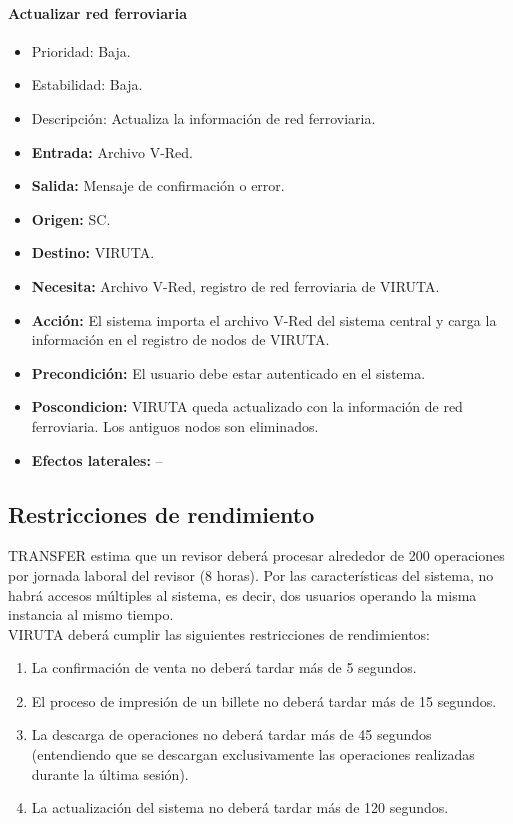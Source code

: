\paragraph{Actualizar red ferroviaria}

\begin{itemize}
\item Prioridad: Baja.
\item Estabilidad: Baja.
\item Descripción: Actualiza la información de red ferroviaria.
\item  \textbf{Entrada:} Archivo V-Red.
\item \textbf{Salida:} Mensaje de confirmación o error.
\item \textbf{Origen:} SC.
\item \textbf{Destino:} VIRUTA.
\item \textbf{Necesita:} Archivo V-Red, registro de red ferroviaria de VIRUTA.
\item \textbf{Acción:} El sistema importa el archivo V-Red del sistema central y carga la información en el registro de nodos de VIRUTA.
\item \textbf{Precondición:} El usuario debe estar autenticado en el sistema.
\item \textbf{Poscondicion:} VIRUTA queda actualizado con la información de red ferroviaria. Los antiguos nodos son eliminados.
\item \textbf{Efectos laterales:} --
\end{itemize}

\subsection{Restricciones de rendimiento}

TRANSFER estima que un revisor deberá procesar alrededor de 200 operaciones por jornada laboral del revisor (8 horas).
Por las características del sistema, no habrá accesos múltiples al sistema, es decir, dos usuarios operando la misma instancia al mismo tiempo.\\

VIRUTA deberá cumplir las siguientes restricciones de rendimientos:

\begin{enumerate}
\item La confirmación de venta no deberá tardar más de 5 segundos.
\item El proceso de impresión de un billete no deberá tardar más de 15 segundos.
\item La descarga de operaciones no deberá tardar más de 45 segundos (entendiendo que se descargan exclusivamente las operaciones realizadas durante la última sesión).
\item La actualización del sistema no deberá tardar más de 120 segundos.
\end{enumerate}


